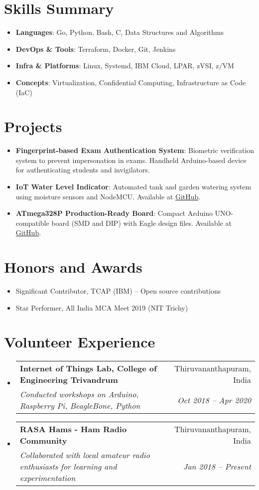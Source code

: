 \documentclass[a4paper,20pt]{article}
\makeatletter
\newcommand{\resumeItem}[2]{
  \item\small{\textbf{#1}{: #2 \vspace{-2pt}}}
}
\newcommand{\resumeSubheading}[4]{
  \vspace{-1pt}\item
  \begin{tabular*}{0.97\textwidth}{l@{\extracolsep{\fill}}r}
    \textbf{#1} & #2 \\
    \textit{#3} & \textit{#4} \\
  \end{tabular*}\vspace{-5pt}
}
\newcommand{\resumeSubItem}[2]{\resumeItem{#1}{#2}\vspace{-3pt}}
\newcommand{\resumeSubHeadingListStart}{\begin{itemize}[leftmargin=*]}
\newcommand{\resumeSubHeadingListEnd}{\end{itemize}}
\makeatother
\begin{document}
\section{Skills Summary}
    \resumeSubHeadingListStart
        \resumeSubItem{Languages}{Go, Python, Bash, C, Data Structures and Algorithms}
        \resumeSubItem{DevOps \& Tools}{Terraform, Docker, Git, Jenkins}
        \resumeSubItem{Infra \& Platforms}{Linux, Systemd, IBM Cloud, LPAR, zVSI, z/VM}
        \resumeSubItem{Concepts}{Virtualization, Confidential Computing, Infrastructure as Code (IaC)}
    \resumeSubHeadingListEnd

\section{Projects}
    \resumeSubHeadingListStart
        \resumeSubItem
            {Fingerprint-based Exam Authentication System}
            {Biometric verification system to prevent impersonation in exams. Handheld Arduino-based device for authenticating students and invigilators.}
        \resumeSubItem
            {IoT Water Level Indicator}
            {Automated tank and garden watering system using moisture sensors and NodeMCU. Available at \href{https://github.com/sashwat-project-hardware/iot-water-level-indicator}{GitHub}.}
        \resumeSubItem
            {ATmega328P Production-Ready Board}
            {Compact Arduino UNO-compatible board (SMD and DIP) with Eagle design files. Available at \href{https://github.com/sashwat-project-hardware/sph-mc-one}{GitHub}.}
    \resumeSubHeadingListEnd

\section{Honors and Awards}
    \begin{itemize}
        \item Significant Contributor, TCAP (IBM) – Open source contributions
        \item Star Performer, All India MCA Meet 2019 (NIT Trichy)
    \end{itemize}

\section{Volunteer Experience}
\resumeSubHeadingListStart
    \resumeSubheading
        {Internet of Things Lab, College of Engineering Trivandrum}{Thiruvananthapuram, India}
        {Conducted workshops on Arduino, Raspberry Pi, BeagleBone, Python}{Oct 2018 -- Apr 2020}
    \resumeSubheading
        {RASA Hams - Ham Radio Community}{Thiruvananthapuram, India}
        {Collaborated with local amateur radio enthusiasts for learning and experimentation}{Jan 2018 -- Present}
    \resumeSubHeadingListEnd
\end{document}
